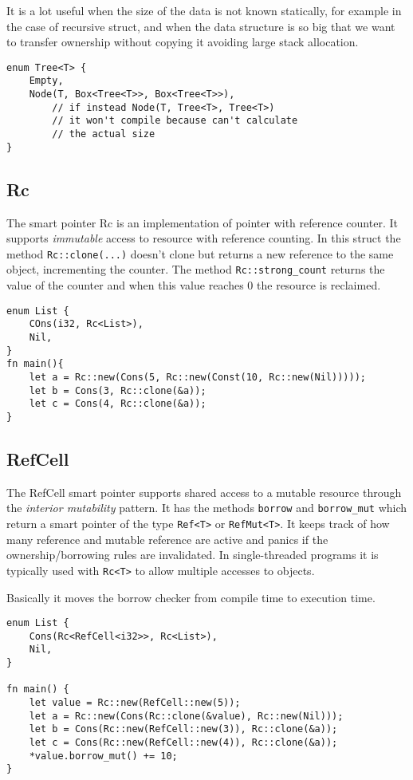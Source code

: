 It is a lot useful when the size of the data is not known statically, for example in the case of recursive struct, and when the data structure is so big that we want to transfer ownership without copying it avoiding large stack allocation.
\begin{verbatim}
enum Tree<T> {
    Empty,
    Node(T, Box<Tree<T>>, Box<Tree<T>>),
        // if instead Node(T, Tree<T>, Tree<T>)
        // it won't compile because can't calculate
        // the actual size
}
\end{verbatim}

\subsection{Rc}
The smart pointer Rc is an implementation of pointer with reference counter.
It supports \emph{immutable} access to resource with reference counting.
In this struct the method \verb|Rc::clone(...)| doesn't clone but returns a new reference to the same object, incrementing the counter.
The method \verb|Rc::strong_count| returns the value of the counter and when this value reaches 0 the resource is reclaimed.

\begin{verbatim}
enum List {
    COns(i32, Rc<List>),
    Nil,
}
fn main(){
    let a = Rc::new(Cons(5, Rc::new(Const(10, Rc::new(Nil)))));
    let b = Cons(3, Rc::clone(&a));
    let c = Cons(4, Rc::clone(&a));
}
\end{verbatim}

\subsection{RefCell}
The RefCell smart pointer supports shared access to a mutable resource through the \emph{interior mutability} pattern.
It has the methods \verb|borrow| and \verb|borrow_mut| which return a smart pointer of the type \verb|Ref<T>| or \verb|RefMut<T>|.
It keeps track of how many reference and mutable reference are active and panics if the ownership/borrowing rules are invalidated.
In single-threaded programs it is typically used with \verb|Rc<T>| to allow multiple accesses to objects. 

Basically it moves the borrow checker from compile time to execution time.

\begin{verbatim}
enum List {
    Cons(Rc<RefCell<i32>>, Rc<List>),
    Nil,
}

fn main() {
    let value = Rc::new(RefCell::new(5));
    let a = Rc::new(Cons(Rc::clone(&value), Rc::new(Nil)));
    let b = Cons(Rc::new(RefCell::new(3)), Rc::clone(&a));
    let c = Cons(Rc::new(RefCell::new(4)), Rc::clone(&a));
    *value.borrow_mut() += 10;
}
\end{verbatim}

